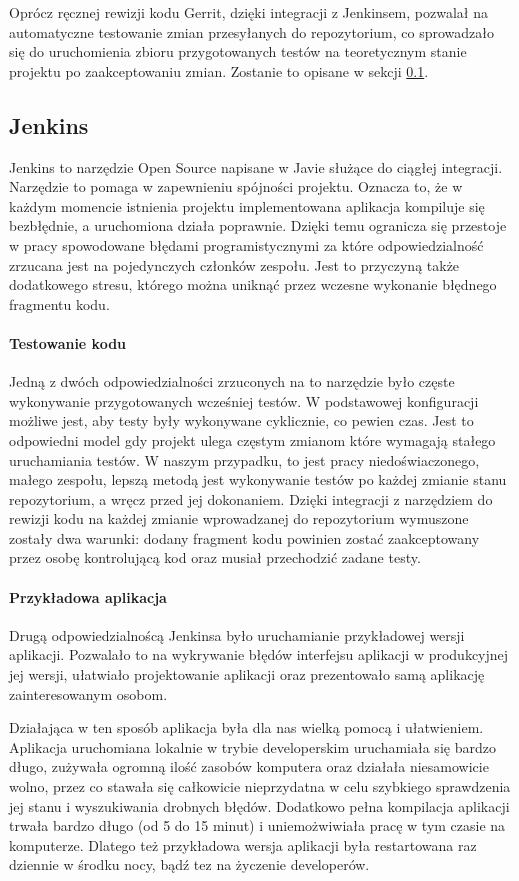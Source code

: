 \documentclass[licencjacka]{pracamgr}
\begin{document}
Oprócz ręcznej rewizji kodu Gerrit, dzięki integracji z Jenkinsem, pozwalał na automatyczne testowanie zmian przesyłanych do repozytorium, co sprowadzało się do uruchomienia zbioru przygotowanych testów na teoretycznym stanie projektu po zaakceptowaniu zmian. Zostanie to opisane w sekcji \ref{r:jenkins}.

\subsection{Jenkins}\label{r:jenkins}
Jenkins to narzędzie Open Source napisane w Javie służące do ciągłej integracji. Narzędzie to pomaga w zapewnieniu spójności projektu. Oznacza to, że w każdym momencie istnienia projektu implementowana aplikacja kompiluje się bezbłędnie, a uruchomiona działa poprawnie. Dzięki temu ogranicza się przestoje w pracy spowodowane błędami programistycznymi za które odpowiedzialność zrzucana jest na pojedynczych członków zespołu. Jest to przyczyną także dodatkowego stresu, którego można uniknąć przez wczesne wykonanie błędnego fragmentu kodu.

\paragraph{Testowanie kodu}
Jedną z dwóch odpowiedzialności zrzuconych na to narzędzie było częste wykonywanie przygotowanych wcześniej testów. W podstawowej konfiguracji możliwe jest, aby testy były wykonywane cyklicznie, co pewien czas. Jest to odpowiedni model gdy projekt ulega częstym zmianom które wymagają stałego uruchamiania testów. W naszym przypadku, to jest pracy niedoświaczonego, małego zespołu, lepszą metodą jest wykonywanie testów po każdej zmianie stanu repozytorium, a wręcz przed jej dokonaniem. Dzięki integracji z narzędziem do rewizji kodu na każdej zmianie wprowadzanej do repozytorium wymuszone zostały dwa warunki: dodany fragment kodu powinien zostać zaakceptowany przez osobę kontrolującą kod oraz musiał przechodzić zadane testy.

\paragraph{Przykładowa aplikacja}
Drugą odpowiedzialnoścą Jenkinsa było uruchamianie przykładowej wersji aplikacji. Pozwalało to na wykrywanie błędów interfejsu aplikacji w produkcyjnej jej wersji, ułatwiało projektowanie aplikacji oraz prezentowało samą aplikację zainteresowanym osobom.

Działająca w ten sposób aplikacja była dla nas wielką pomocą i ułatwieniem. Aplikacja uruchomiana lokalnie w trybie developerskim uruchamiała się bardzo długo, zużywała ogromną ilość zasobów komputera oraz działała niesamowicie wolno, przez co stawała się całkowicie nieprzydatna w celu szybkiego sprawdzenia jej stanu i wyszukiwania drobnych błędów. Dodatkowo pełna kompilacja aplikacji trwała bardzo długo (od 5 do 15 minut) i uniemożwiwiała pracę w tym czasie na komputerze. Dlatego też przykładowa wersja aplikacji była restartowana raz dziennie w środku nocy, bądź tez na życzenie developerów.  
\end{document}
